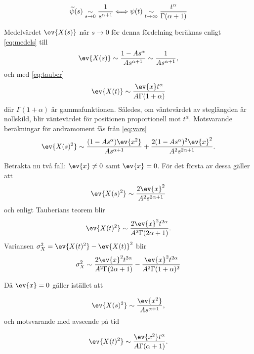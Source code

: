 \begin{equation}\label{eq:tauber}
   \widetilde{\psi} (s)\underset{s\to 0}{\sim}\frac{1}{s^{\alpha+1}}\Longleftrightarrow \psi(t)\underset{t\to\infty}{\sim}\frac{t^{\alpha}}{\Gamma (\alpha+1)}
\end{equation}

Medelvärdet $\ev{X(s)}$ när $s\to 0$ för denna fördelning beräknas enligt \eqref{eq:medels} till
\begin{equation}
    \ev{X(s)} \sim \frac{1-As^{\alpha}}{As^{\alpha+1}} \sim \frac{1}{As^{\alpha+1}},
\end{equation}
och med \eqref{eq:tauber}
\begin{equation}
    \ev{X(t)} \sim \frac{\ev{x}t^{\alpha}}{A\Gamma (1+\alpha)}
\end{equation}
där $\Gamma (1+\alpha)$ är gammafunktionen. Således, om väntevärdet av steglängden är nollskild, blir väntevärdet för positionen proportionell mot $t^{\alpha}$. Motsvarande beräkningar för andramoment fås från \eqref{eq:vars}
\begin{equation}
   \ev{X(s)^2} \sim \frac{(1-As^{\alpha})\ev{x^2}}{As^{\alpha+1}}+\frac{2(1-As^{\alpha})^2\ev{x}^2}{A^2s^{2\alpha+1}}.
\end{equation}

Betrakta nu två fall: $\ev{x}\neq0$ samt $\ev{x}=0$. För det första av dessa gäller att
\begin{equation}
   \ev{X(s)^2} \sim \frac{2\ev{x}^2}{A^2s^{2\alpha+1}}
\end{equation}
och enligt Tauberians teorem blir
\begin{equation}
   \ev{X(t)^2} \sim \frac{2\ev{x}^2t^{2\alpha}}{A^2\Gamma (2\alpha+1)}.
\end{equation}
Variansen $\sigma_X^2 = \ev{X(t)^2}-\ev{X(t)}^2$ blir 
\begin{equation}
    \sigma_X^2 \sim \frac{2\ev{x}^2t^{2\alpha}}{A^2\Gamma (2\alpha+1)}-\frac{\ev{x}^2t^{2\alpha}}{A^2\Gamma (1+\alpha)^2}
\end{equation}


Då $\ev{x}=0$ gäller istället att

\begin{equation}
   \ev{X(s)^2}\sim \frac{\ev{x^2}}{As^{\alpha+1}},
\end{equation}
och motsvarande med avseende på tid 

\begin{equation}
   \ev{X(t)^2} \sim \frac{\ev{x^2}t^{\alpha}}{A\Gamma (\alpha+1)}.
\end{equation}

